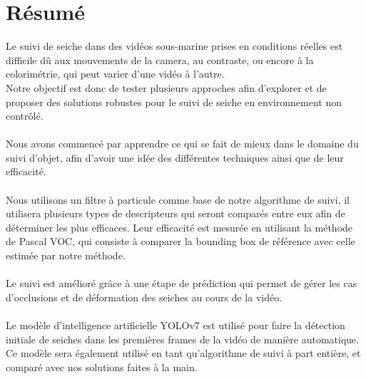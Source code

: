 \chapter*{Résumé}
Le suivi de seiche dans des vidéos sous-marine prises en conditions réelles est difficile dû aux mouvements de la camera, au contraste, ou encore à la colorimétrie, qui peut varier d'une vidéo à l'autre.\\
Notre objectif est donc de tester plusieurs approches afin d'explorer et de proposer des solutions robustes pour le suivi de seiche en environnement non contrôlé.\\
\\
Nous avons commencé par apprendre ce qui se fait de mieux dans le domaine du suivi d'objet, afin d'avoir une idée des différentes techniques ainsi que de leur efficacité.\\
\\
Nous utilisons un filtre à particule comme base de notre algorithme de suivi, il utilisera plusieurs types de descripteurs qui seront comparés entre eux afin de déterminer les plus efficaces. Leur efficacité est mesurée en utilisant la méthode de Pascal VOC, qui consiste à comparer la bounding box de référence avec celle estimée par notre méthode.\\
\\
Le suivi est amélioré grâce à une étape de prédiction qui permet de gérer les cas d'occlusions et de déformation des seiches au cours de la vidéo.\\
\\
Le modèle d'intelligence artificielle YOLOv7 est utilisé pour faire la détection initiale de seiches dans les premières frames de la vidéo de manière automatique.\\
Ce modèle sera également utilisé en tant qu'algorithme de suivi à part entière, et comparé avec nos solutions faites à la main.\\


\clearpage
